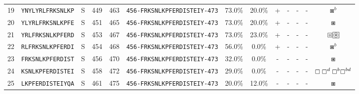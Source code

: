 \begin{tabular}{rcccccccccccc}
19 &  \texttt{YNYLYRLFRKSNLKP} &       S &    449 &   463 &  \texttt{{\scriptsize 456-}FRKSNLKPFERDISTEIY{\scriptsize -473}} &                          73.0\% &                           20.0\% &          + &           - &          - &           - &                                                                                                                         $ \boxast^b $ \\
20 &  \texttt{YLYRLFRKSNLKPFE} &       S &    451 &   465 &  \texttt{{\scriptsize 456-}FRKSNLKPFERDISTEIY{\scriptsize -473}} &                          73.0\% &                           20.0\% &          + &           - &          - &           - &                                                                                                                           $ \boxast $ \\
21 &  \texttt{YRLFRKSNLKPFERD} &       S &    453 &   467 &  \texttt{{\scriptsize 456-}FRKSNLKPFERDISTEIY{\scriptsize -473}} &                          73.0\% &                           23.0\% &          + &           - &          - &           - &                                                                        $ \boxcircle \setlength{\fboxsep}{0.5pt} \boxed{\circledast} $ \\
22 &  \texttt{RLFRKSNLKPFERDI} &       S &    454 &   468 &  \texttt{{\scriptsize 456-}FRKSNLKPFERDISTEIY{\scriptsize -473}} &                          56.0\% &                            0.0\% &          + &           - &          - &           - &                                                                                                                         $ \boxast^b $ \\
23 &  \texttt{FRKSNLKPFERDIST} &       S &    456 &   470 &  \texttt{{\scriptsize 456-}FRKSNLKPFERDISTEIY{\scriptsize -473}} &                          32.0\% &                            0.0\% &          - &           - &          - &           - &                                                                                                                           $ \boxast $ \\
24 &  \texttt{KSNLKPFERDISTEI} &       S &    458 &   472 &  \texttt{{\scriptsize 456-}FRKSNLKPFERDISTEIY{\scriptsize -473}} &                          29.0\% &                            0.0\% &          - &           - &          - &           - &                                                                                  $ \boxempty \boxempty^d \boxempty^b \boxempty^{bd} $ \\
25 &  \texttt{LKPFERDISTEIYQA} &       S &    461 &   475 &  \texttt{{\scriptsize 456-}FRKSNLKPFERDISTEIY{\scriptsize -473}} &                          20.0\% &                           12.0\% &          - &           - &          - &           - &                                                                                                                           $ \boxast $ \\

\end{tabular}

